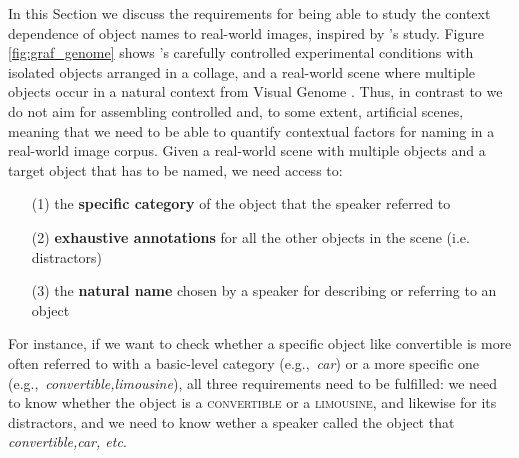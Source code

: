 \documentclass[runningheads]{llncs}
\newcommand{\refexp}[1]{\textsl{#1}}
\newcommand{\cat}[1]{\textsc{#1}}
\begin{document}
In this Section we discuss the requirements for  being able to study the context dependence of object names to real-world images, inspired by \cite{graf2016animal}'s study.
 Figure \ref{fig:graf_genome} shows  \cite{graf2016animal}'s carefully controlled experimental conditions with isolated objects arranged in a collage, and a real-world scene where multiple objects occur in a natural context from Visual Genome \cite{krishna2016visualgenome}.
Thus, in contrast to \cite{graf2016animal} we do not aim for assembling controlled and, to some extent, artificial scenes, meaning that we need to be able to quantify contextual factors for naming in a real-world image corpus. 
Given a real-world scene with multiple objects and a target object that has to be named, we need access to:

\begin{itemize}
    
		\item[(1)] the \textbf{specific category} of the object that the speaker referred to 
		\item[(2)] \textbf{exhaustive annotations} for all the other objects in the scene (i.e. distractors)
		\item[(3)] the \textbf{natural name} chosen by a speaker for describing or referring to an object

\end{itemize}

For instance, if we want to check whether a specific object like convertible is more often referred to with a basic-level category (e.g.,~\refexp{car}) or a more specific one (e.g.,~\refexp{convertible,limousine}), all three requirements need to be fulfilled: we need to know whether the object is a \cat{convertible} or  a \cat{limousine}, and likewise for its distractors, and we need to know wether a speaker called the object that \refexp{convertible,car, etc}.
\end{document}
